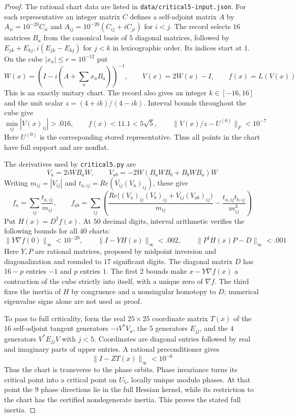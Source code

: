 \documentclass[11pt,a4paper]{article}
\begin{document}
\begin{proof}
The rational chart data are listed in \texttt{data/critical5-input.json}.
For each representative an integer matrix $C$ defines a self-adjoint
matrix $A$ by $A_{ii}=10^{-20}C_{ii}$ and
$A_{ij}=10^{-20}(C_{ij}+iC_{ji})$ for $i<j$.
The record selects $16$ matrices $B_a$ from the canonical basis of
$5$ diagonal matrices, followed by $E_{jk}+E_{kj},i(E_{jk}-E_{kj})$
for $j<k$ in lexicographic order. Its indices start at $1$.
On the cube $|x_a|\le r=10^{-12}$ put
\[
 W(x)=\left(I-i\left(A+\sum_a x_aB_a\right)\right)^{-1},\qquad
 V(x)=2W(x)-I,\qquad f(x)=L(V(x))
\]
This is an exactly unitary chart. The record also gives an integer
$k\in[-16,16]$ and the unit scalar $z=(4+ik)/(4-ik)$.
Interval bounds throughout the cube give
\[
 \min_{ij}|V(x)_{ij}|>.016,\qquad
 f(x)<11.1<5\sqrt5,\qquad
 \|V(x)/z-U^{(0)}\|_F<10^{-7}
\]
Here $U^{(0)}$ is the corresponding stored representative. Thus all
points in the chart have full support and are nonflat.

The derivatives used by \texttt{critical5.py} are
\[
 V_a=2iWB_aW,\qquad
 V_{ab}=-2W(B_aWB_b+B_bWB_a)W
\]
Writing $m_{ij}=|V_{ij}|$ and
$t_{a,ij}=Re(\overline{V_{ij}}(V_a)_{ij})$, these give
\[
 f_a=\sum_{ij}\frac{t_{a,ij}}{m_{ij}},\qquad
 f_{ab}=\sum_{ij}\left(
 \frac{Re\big(\overline{(V_a)_{ij}}(V_b)_{ij}
                   +\overline{V_{ij}}(V_{ab})_{ij}\big)}{m_{ij}}
 -\frac{t_{a,ij}t_{b,ij}}{m_{ij}^3}\right)
\]
Put $H(x)=D^2f(x)$. At $50$ decimal digits, interval arithmetic
verifies the following bounds for all $40$ charts:
\[
 \|Y\nabla f(0)\|_\infty<10^{-20},\qquad
 \|I-YH(x)\|_\infty<.002,\qquad
 \|P^tH(x)P-D\|_\infty<.001
\]
Here $Y,P$ are rational matrices, proposed by midpoint inversion and
diagonalization and rounded to $17$ significant digits. The diagonal
matrix $D$ has $16-p$ entries $-1$ and $p$ entries $1$.
The first 2 bounds make $x-Y\nabla f(x)$ a contraction of the cube
strictly into itself, with a unique zero of $\nabla f$.
The third fixes the inertia of $H$ by congruence and a nonsingular
homotopy to $D$; numerical eigenvalue signs alone are not used as proof.

To pass to full criticality, form the real $25\times25$ coordinate
matrix $T(x)$ of the $16$ self-adjoint tangent generators $-iV^*V_a$,
the $5$ generators $E_{jj}$, and the $4$ generators $V^*E_{jj}V$
with $j<5$. Coordinates are diagonal entries followed by real and
imaginary parts of upper entries. A rational preconditioner gives
\[
 \|I-ZT(x)\|_\infty<10^{-6}
\]
Thus the chart is transverse to the phase orbits. Phase invariance
turns its critical point into a critical point on $U_5$, locally unique
modulo phases. At that point the $9$ phase directions lie in the full
Hessian kernel, while its restriction to the chart has the certified
nondegenerate inertia. This proves the stated full inertia.


\end{proof}
\end{document}
